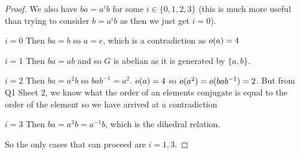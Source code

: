 \documentclass[../main.tex]{subfiles}
\begin{document}
\begin{proof}
  We also have $ba = a^{i}b$ for some $i \in \{0, 1, 2, 3\}$ (this is much more useful than trying to consider $b = a^{i}b$ as then we just get $i = 0$).
  \begin{proofcases}
    \begin{case}{$i = 0$}
      Then $ba = b$ so $a = e$, which is a contradiction as $o(a) = 4$ \cross
    \end{case}
    \begin{case}{$i = 1$}
      Then $ba = ab$ and so $G$ is abelian as it is generated by $\{a, b\}$.
    \end{case}
    \begin{case}{$i = 2$}
      Then $ba = a^2 b$ so $bab^{-1} = a^2$.
      $o(a) = 4$ so $o(a^2) = o(bab^{-1}) = 2$.
      But from Q1 Sheet 2, we know what the order of an elements conjugate is equal to the order of the element so we have arrived at a contradiction \cross
    \end{case}
    \begin{case}{$i = 3$}
      Then $ba = a^3b = a^{-1}b$, which is the dihedral relation.
    \end{case}
  \end{proofcases}
  So the only cases that can proceed are $i = 1, 3$.


\end{proof}
\end{document}
